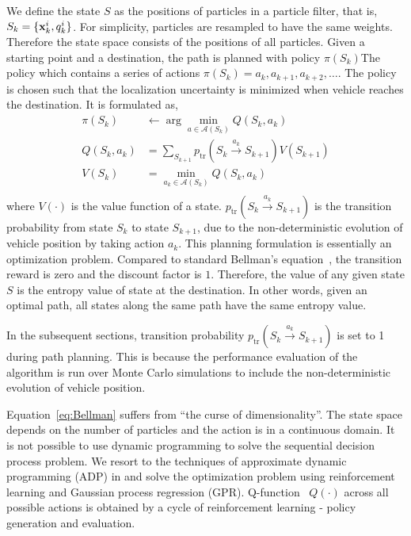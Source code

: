 We define the state $S$ as the positions of particles in a particle filter, that is, $S_k=\{{\bf x}_k^i,q_k^i\}$. For simplicity, particles are resampled to have the same weights. Therefore the state space consists of the positions of all particles. Given a starting point and a destination, the path is planned with policy $\pi(S_k)$The policy which contains a series of actions $\pi(S_k)={a_k,a_{k+1},a_{k+2},\ldots}$. The policy is chosen such that the localization uncertainty is minimized when vehicle reaches the destination. It is formulated as,
\begin{equation}
\label{eq:Bellman}
\begin{aligned}
\pi(S_k)&\leftarrow\arg\min_{a\in{\mathcal{A}}(S_k)}Q(S_k,a_k) \\
Q(S_k,a_k)&=\sum_{S_{k+1}}p_{\text{tr}}(S_k\xrightarrow{a_k}S_{k+1})V(S_{k+1}) \\
V(S_k)&=\min_{a_k\in{\mathcal{A}}(S_k)}Q(S_k,a_k)\\
\end{aligned}
\end{equation}
where $V(\cdot)$ is the value function of a state. $p_\text{tr}(S_k\xrightarrow{a_k}S_{k+1})$ is the transition probability from state $S_k$ to state $S_{k+1}$, due to the non-deterministic evolution of vehicle position by taking action $a_k$. This planning formulation is essentially an optimization problem. Compared to standard Bellman's equation~\cite{ADP-book}, the transition reward is zero and the discount factor is $1$. Therefore, the value of any given state $S$ is the entropy value of state at the destination. In other words, given an optimal path, all states along the same path have the same entropy value.

In the subsequent sections, transition probability $p_{\text{tr}}(S_k\xrightarrow{a_k}S_{k+1})$ is set to 1 during path planning. This is because the performance evaluation of the algorithm is run over Monte Carlo simulations to include the non-deterministic evolution of vehicle position.

Equation~\eqref{eq:Bellman} suffers from ``the curse of dimensionality''. The state space depends on the number of particles and the action is in a continuous domain. It is not possible to use dynamic programming to solve the sequential decision process problem. We resort to the techniques of approximate dynamic programming (ADP) in \cite{ADP-book} and solve the optimization problem using reinforcement learning and Gaussian process regression (GPR).  
Q-function~\cite{RL-book} $Q(\cdot)$ across all possible actions is obtained by a cycle of reinforcement learning - policy generation and evaluation.

